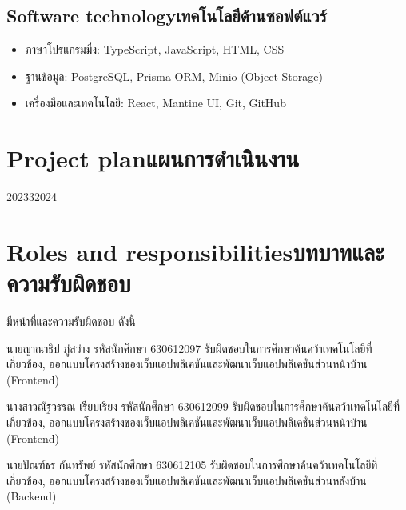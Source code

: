 \subsection{\ifenglish Software technology\else เทคโนโลยีด้านซอฟต์แวร์\fi}
\begin{itemize}
    \item ภาษาโปรแกรมมิ่ง: TypeScript, JavaScript, HTML, CSS
    \item ฐานข้อมูล: PostgreSQL, Prisma ORM, Minio (Object Storage)
    \item เครื่องมือและเทคโนโลยี: React, Mantine UI, Git, GitHub
\end{itemize}

\section{\ifenglish Project plan\else แผนการดำเนินงาน\fi}

\begin{plan}{7}{2023}{3}{2024}
\end{plan}

\section{\ifenglish Roles and responsibilities\else บทบาทและความรับผิดชอบ\fi}
มีหน้าที่และความรับผิดชอบ ดังนี้


นายญาณาธิป ภู่สว่าง รหัสนักศึกษา 630612097 รับผิดชอบในการศึกษาค้นคว้าเทคโนโลยีที่เกี่ยวข้อง, ออกแบบโครงสร้างของเว็บแอปพลิเคชันและพัฒนาเว็บแอปพลิเคชันส่วนหน้าบ้าน (Frontend)

นางสาวณัฐวรรณ เรียบเรียง รหัสนักศึกษา 630612099 รับผิดชอบในการศึกษาค้นคว้าเทคโนโลยีที่เกี่ยวข้อง, ออกแบบโครงสร้างของเว็บแอปพลิเคชันและพัฒนาเว็บแอปพลิเคชันส่วนหน้าบ้าน (Frontend)

นายปัณฑ์ธร กันทรัพย์ รหัสนักศึกษา 630612105 รับผิดชอบในการศึกษาค้นคว้าเทคโนโลยีที่เกี่ยวข้อง, ออกแบบโครงสร้างของเว็บแอปพลิเคชันและพัฒนาเว็บแอปพลิเคชันส่วนหลังบ้าน (Backend)




